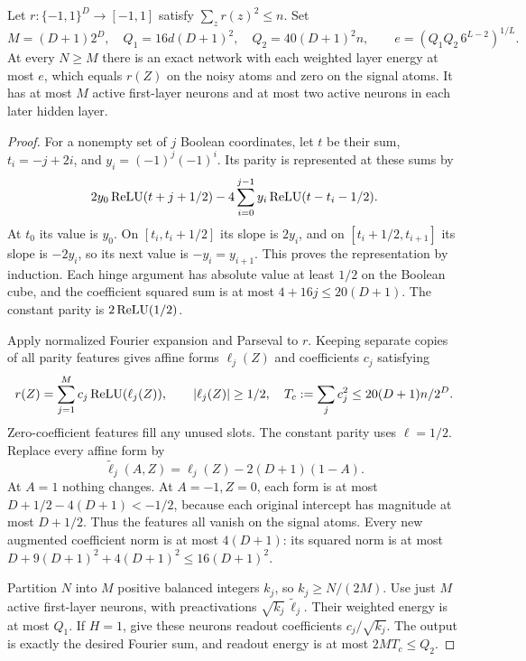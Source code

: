 \begin{lemma}
\label{lem:relu-gated-memorizer}
Let $r:\{-1,1\}^D\to[-1,1]$ satisfy $\sum_zr(z)^2\le n$.
Set
\[
 M=(D+1)2^D,\quad Q_1=16d(D+1)^2,\quad Q_2=40(D+1)^2n,
 \qquad e=(Q_1Q_2\,6^{L-2})^{1/L}.
\]
At every $N\ge M$ there is an exact network with each weighted layer
energy at most $e$, which equals $r(Z)$ on the noisy atoms and zero
on the signal atoms. It has at most $M$ active first-layer neurons
and at most two active neurons in each later hidden layer.
\end{lemma}
\begin{proof}
For a nonempty set of $j$ Boolean coordinates, let $t$ be their sum,
$t_i=-j+2i$, and $y_i=(-1)^j(-1)^i$. Its parity is represented at
these sums by
\begin{equation}
 2y_0\operatorname{ReLU}(t+j+1/2)
       -4\sum_{i=0}^{j-1}y_i\operatorname{ReLU}(t-t_i-1/2).
 \label{eq:relu-margin-parity}
\end{equation}
At $t_0$ its value is $y_0$. On $[t_i,t_i+1/2]$ its slope is
$2y_i$, and on $[t_i+1/2,t_{i+1}]$ its slope is $-2y_i$, so its
next value is $-y_i=y_{i+1}$. This proves the representation by
induction. Each hinge argument has absolute value at least $1/2$ on
the Boolean cube, and the coefficient squared sum is at most
$4+16j\le20(D+1)$. The constant parity is $2\operatorname{ReLU}(1/2)$.

Apply normalized Fourier expansion and Parseval to $r$. Keeping
separate copies of all parity features gives affine forms $\ell_j(Z)$ and coefficients
$c_j$ satisfying
\[
 r(Z)=\sum_{j=1}^M c_j\operatorname{ReLU}(\ell_j(Z)),\qquad
 |\ell_j(Z)|\ge1/2,
 \quad T_c:=\sum_jc_j^2\le20(D+1)n/2^D.
\]
Zero-coefficient features fill any unused slots. The constant parity
uses $\ell=1/2$. Replace every affine form by
\[
 \widetilde\ell_j(A,Z)=\ell_j(Z)-2(D+1)(1-A).
\]
At $A=1$ nothing changes. At $A=-1,Z=0$, each form is at most
$D+1/2-4(D+1)<-1/2$, because each original intercept has magnitude
at most $D+1/2$. Thus the features all vanish on the signal atoms.
Every new augmented coefficient norm is at most $4(D+1)$: its squared
norm is at most $D+9(D+1)^2+4(D+1)^2\le16(D+1)^2$.

Partition $N$ into $M$ positive balanced integers $k_j$, so
$k_j\ge N/(2M)$. Use just $M$ active first-layer neurons, with
preactivations $\sqrt{k_j}\,\widetilde\ell_j$.
Their weighted energy is at most $Q_1$.
If $H=1$, give these neurons readout coefficients $c_j/\sqrt{k_j}$.
The output is exactly the desired Fourier sum, and readout energy is
at most $2MT_c\le Q_2$.


\end{proof}
